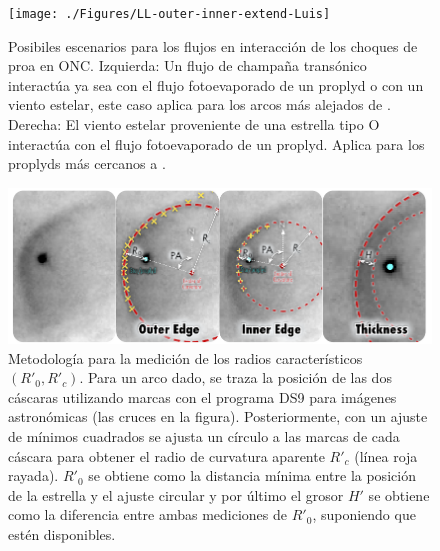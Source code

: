 \begin{figure}
  \centering
  \texttt{[image: ./Figures/LL-outer-inner-extend-Luis]}
  \caption{Posibiles escenarios para los flujos en interacción de los choques de proa en ONC. Izquierda: Un flujo de champaña transónico interactúa ya sea con el flujo fotoevaporado de un proplyd o con un viento estelar, este caso aplica para los arcos más alejados de \thC{}. Derecha: El viento estelar proveniente de una estrella tipo O interactúa con el flujo fotoevaporado de un proplyd. Aplica para los proplyds más cercanos a \thC{}.}
  \label{fig:LL-scheme}
\end{figure}

\begin{figure}
  \centering
  \includegraphics[width=0.7\linewidth]{./Figures/radius-methodology-Luis}
  \caption{Metodología para la medición de los radios característicos $(R'_0, R'_c)$. Para un arco dado, se traza la posición de las dos cáscaras utilizando marcas con el programa DS9 para imágenes astronómicas (las cruces en la figura). Posteriormente, con un ajuste de mínimos cuadrados se ajusta un círculo a las marcas de cada cáscara para obtener el radio de curvatura aparente $R'_c$ (línea roja rayada). $R'_0$ se obtiene como la distancia mínima entre la posición de la estrella y el ajuste circular y por último el grosor $H'$ se obtiene como la diferencia entre ambas mediciones de $R'_0$, suponiendo que estén disponibles.}
  \label{fig:methodology-LL}
\end{figure}

